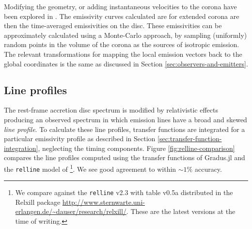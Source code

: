 \documentclass[fleqn,usenatbib]{mnras}
\newcommand{\Gradus}{Gradus.jl\xspace}
\newcommand{\relline}{\texttt{relline} }
\begin{document}
Modifying the geometry, or adding instantaneous velocities to the corona have
been explored in \cite{gonzalez_probing_2017}. The emissivity curves calculated
are for extended corona are then the time-averaged emissivities on the disc.
These emissivities can be approximately calculated using a Monte-Carlo approach,
by sampling (uniformly) random points in the volume of the corona as the sources
of isotropic emission. The relevant transformations for mapping the local
emission vectors back to the global coordinates is the same as discussed in
Section \ref{sec:observers-and-emitters}.

\subsection{Line profiles}

The rest-frame accretion disc spectrum is modified by relativistic effects producing an observed spectrum in which emission lines have a broad and skewed \emph{line profile}.
To calculate these line profiles, transfer functions are integrated for a particular emissivity profile as described in Section
\ref{sec:transfer-function-integration}, neglecting the timing components.
Figure \ref{fig:relline-comparison} compares the line profiles computed using
the transfer functions of \Gradus and the \relline model of
\cite{dauser_broad_2010}\footnote{We compare against the \relline v2.3 with
table v0.5a distributed in the Relxill package
\url{http://www.sternwarte.uni-erlangen.de/~dauser/research/relxill/}. These are
the latest versions at the time of writing.}. We see good agreement to within $\sim
1\%$ accuracy.
\end{document}
